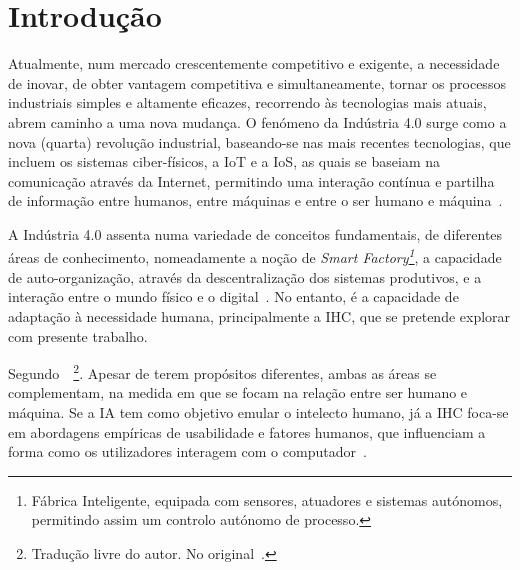 \chapter{Introdução}
\label{chap:Chapter1}

Atualmente, num mercado crescentemente competitivo e exigente, a necessidade de inovar, de obter vantagem competitiva e simultaneamente, tornar os processos industriais simples e altamente eficazes, recorrendo às tecnologias mais atuais, abrem caminho a uma nova mudança. O fenómeno da Indústria 4.0 surge como a nova (quarta) revolução industrial, baseando-se nas mais recentes tecnologias, que incluem os sistemas ciber-físicos, a \gls{IoT} e a \gls{IoS}, as quais se baseiam na comunicação através da Internet, permitindo uma interação contínua e partilha de informação entre humanos, entre máquinas e entre o ser humano e máquina~\parencite{complex_view_industry40}. 

A Indústria 4.0 assenta numa variedade de conceitos fundamentais, de diferentes áreas de conhecimento, nomeadamente a noção de \textit{Smart Factory\footnote{Fábrica Inteligente, equipada com sensores, atuadores e sistemas autónomos, permitindo assim um controlo autónomo de processo.}}, a capacidade de auto-organização, através da descentralização dos sistemas produtivos, e a interação entre o mundo físico e o digital~\parencite[Fundamental Concepts, p.240]{industry40}. No entanto, é a capacidade de adaptação à necessidade humana, principalmente a \gls{IHC}, que se pretende explorar com presente trabalho.

Segundo~\textcite[p.1]{natural_language_translation_intersaction_ai_hci}~\footnote{Tradução livre do autor. No original~.}. Apesar de terem propósitos diferentes, ambas as áreas se complementam, na medida em que se focam na relação entre ser humano e máquina. Se a \gls{IA} tem como objetivo emular o intelecto humano, já a \gls{IHC} foca-se em abordagens empíricas de usabilidade e fatores humanos, que influenciam a forma como os utilizadores interagem com o computador~\parencite{natural_language_translation_intersaction_ai_hci}. 

